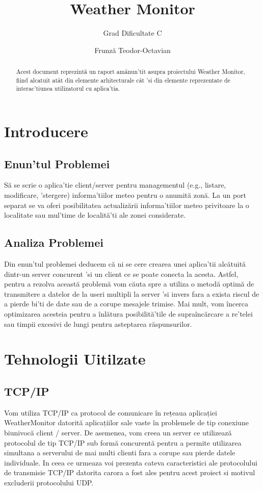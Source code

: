 \documentclass{llncs}
\begin{document}
%
\title{Weather Monitor}
%
\subtitle{Grad Dificultate C}
%
\author{Frunză Teodor-Octavian}
%
%
\maketitle
%
\begin{abstract}
Acest document reprezintă un raport amănun'tit asupra proiectului Weather Monitor, fiind alcatuit atât din elemente arhitecturale cât 'si din elemente reprezentate de interac'tiunea utilizatorul cu aplica'tia.
\end{abstract}
%
\section{Introducere}
%
\subsection{Enun'tul Problemei}
Să se scrie o aplica'tie client/server pentru managementul (e.g., listare, modificare, 'stergere) informa'tiilor meteo pentru o anumită zonă. La un port separat se va oferi posibilitatea actualizării informa'tiilor meteo privitoare la o localitate sau mul'time de localită'ti ale zonei considerate.
%
\subsection{Analiza Problemei}
Din enun'tul problemei deducem că ni se cere crearea unei aplica'tii alcătuită dintr-un server concurent 'si un client ce se poate conecta la acesta.
Astfel, pentru a rezolva această problemă vom căuta spre a utiliza o metodă optimă de transmitere a datelor de la useri multipli la server 'si invers fara a exista riscul de a pierde bi'ti de date sau de a corupe mesajele trimise. Mai mult, vom încerca optimizarea acesteia pentru a înlătura posibilită'tile de supraîncărcare a re'telei sau timpii excesivi de lungi pentru asteptarea răspunsurilor.
%
\section{Tehnologii Uitilzate}
%
\subsection{TCP/IP}
Vom utiliza TCP/IP ca protocol de comunicare în rețeaua aplicației WeatherMonitor datorită aplicațiilor sale vaste în problemele de tip conexiune biunivocă client / server. De asemenea, vom creea un server ce utilizează protocolul de tip TCP/IP sub formă concurentă pentru a permite utilizarea simultana a serverului de mai multi clienti fara a corupe sau pierde datele individuale. In ceea ce urmeaza voi prezenta cateva caracteristici ale protocolului de transmisie TCP/IP datorita carora a fost ales pentru acest proiect si motivul excluderii protocolului UDP.
%
\end{document}

